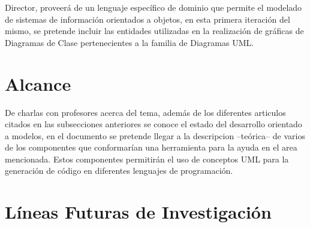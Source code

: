 Director, proveerá de un lenguaje específico de dominio que permite el modelado de
sistemas de información orientados a objetos, en esta primera iteración del
mismo, se pretende incluir las entidades utilizadas en la realización de
gráficas de Diagramas de Clase pertenecientes a la familia de Diagramas UML.

\section{Alcance}%
\label{sec:alcance}
De charlas con profesores acerca del tema, además de los diferentes articulos
citados en las subsecciones anteriores se conoce el estado del desarrollo
orientado a modelos, en el documento se pretende llegar a la descripcion
--teórica--  de
varios de los componentes que conformarían una herramienta para la ayuda en el
area mencionada. Estos componentes permitirán el uso de conceptos UML para la
generación de código en diferentes lenguajes de programación.

\section{Líneas Futuras de Investigación}%
\label{sec:lineas_futuras_de_investigacion}
